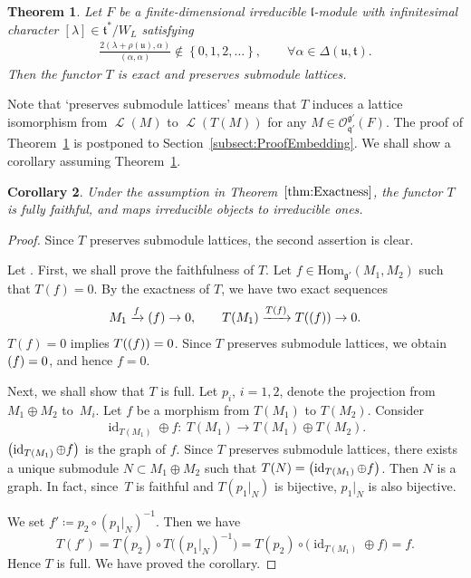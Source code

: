 \documentclass[pdftex]{sigma}
\numberwithin{equation}{section}
\newtheorem{Theorem}{Theorem}[section]
\newtheorem{Corollary}[Theorem]{Corollary}
\theoremstyle{definition}
\newcommand{\set}[1]{\left\{#1 \right\}}
\newcommand{\Hom}{\mathrm{Hom}}
\DeclareMathOperator{\id}{id}
\newcommand{\lie}[1]{\mathfrak{#1}}
\newcommand{\BGGcat}[2]{\mathcal{O}_{\lie{#2}}^{\lie{#1}}}
\let\Im\relax
\DeclareMathOperator{\Im}{\mathrm{Im}}
\newcommand{\rhog}[1]{\rho(#1)}
\DeclareMathOperator{\lattice}{\mathcal{L}}
\begin{document}
\begin{Theorem}\label{thm:Exactness}
	Let $F$ be a finite-dimensional irreducible $\lie{l}$-module with infinitesimal character $[\lambda] \in \lie{t}^*/W_L$
	satisfying
	\begin{align*}
		\frac{2(\lambda+\rhog{\lie{u}}, \alpha)}{(\alpha, \alpha)} \not \in \set{0, 1, 2, \ldots}, \qquad \forall \alpha \in \Delta(\lie{u}, \lie{t}).
	\end{align*}
	Then the functor $T$ is exact and preserves submodule lattices.
\end{Theorem}

Note that `preserves submodule lattices' means that $T$ induces a lattice isomorphism from $\lattice(M)$ to $\lattice(T(M))$ for any $M \in \BGGcat{g'}{q'}(F)$.
The proof of Theorem~\ref{thm:Exactness} is postponed to Section~\ref{subsect:ProofEmbedding}.
We shall show a corollary assuming Theorem~\ref{thm:Exactness}.

\begin{Corollary}\label{cor:CategoryEquivalence}
	Under the assumption in Theorem~$\ref{thm:Exactness}$,
	the functor $T$ is fully faithful, and maps irreducible objects to irreducible ones.
\end{Corollary}

\begin{proof}
	Since $T$ preserves submodule lattices, the second assertion is clear.

	Let \smash{$M_1, M_2 \in \BGGcat{g'}{q'}(F)$}.
	First, we shall prove the faithfulness of $T$.
	Let $f \in \Hom_{\lie{g}'}(M_1, M_2)$ such that $T(f)=0$.
	By the exactness of $T$, we have two exact sequences
	\begin{align*}
		M_1 \xrightarrow{f} \Im(f) \rightarrow 0, \qquad T(M_1) \xrightarrow{T(f)} T(\Im(f)) \rightarrow 0.
	\end{align*}
	$T(f)=0$ implies $T(\Im(f))=0$.
	Since $T$ preserves submodule lattices, we obtain $\Im(f)=0$, and hence $f=0$.

	Next, we shall show that $T$ is full.
	Let $p_i$, $i = 1, 2$, denote the projection from $M_1 \oplus M_2$ to~$M_i$.
	Let $f$ be a morphism from $T(M_1)$ to $T(M_2)$.
	Consider
	\begin{align*}
		\id_{T(M_1)}\oplus f\colon\ T(M_1) \rightarrow T(M_1) \oplus T(M_2).
	\end{align*}
	$\Im\bigl(\id_{T(M_1)} \oplus f\bigr)$ is the graph of $f$.
	Since $T$ preserves submodule lattices, there exists a unique submodule $N \subset M_1 \oplus M_2$
	such that $T(N)=\Im\bigl(\id_{T(M_1)}\oplus f\bigr)$.
	Then $N$ is a graph.
	In fact, since~$T$ is faithful and $T(p_1|_N)$ is bijective,
	$p_1|_N$ is also bijective.

	We set $f'\coloneq p_2\circ(p_1|_N)^{-1}$.
	Then we have
 \[
 T(f')=T(p_2)\circ T\bigl((p_1|_N)^{-1}\bigr)=T(p_2)\circ \bigl(\id_{T(M_1)}\oplus f\bigr)=f.
 \]
	Hence $T$ is full.
	We have proved the corollary.
\end{proof}
\end{document}
